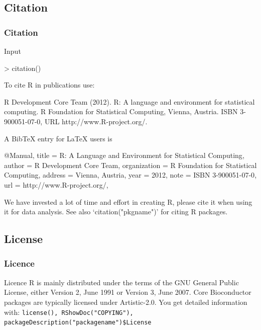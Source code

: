 \documentclass[xcolor={table},c]{beamer}
\begin{document}
\subsection{Citation}
\begin{frame}[shrink=11,fragile,c]\frametitle{Citation}
  \begin{block}{Input}
\begin{semiverbatim}
> citation()
\end{semiverbatim}
  \end{block}
\begin{semiverbatim}
To cite R in publications use:

  R Development Core Team (2012). R: A language and environment for
  statistical computing. R Foundation for Statistical Computing,
  Vienna, Austria. ISBN 3-900051-07-0, URL http://www.R-project.org/.

A BibTeX entry for LaTeX users is

  @Manual{,
    title = {R: A Language and Environment for Statistical Computing},
    author = {{R Development Core Team}},
    organization = {R Foundation for Statistical Computing},
    address = {Vienna, Austria},
    year = {2012},
    note = {{ISBN} 3-900051-07-0},
    url = {http://www.R-project.org/},
  }

We have invested a lot of time and effort in creating R, please cite it
when using it for data analysis. See also ‘citation("pkgname")’ for
citing R packages.

\end{semiverbatim}
\end{frame}

\subsection{License}
\begin{frame}\frametitle{Licence}
\begin{alertblock}{Licence}
R is mainly distributed under the terms of the GNU General
Public License, either Version 2, June 1991 or Version 3, June 2007. Core Bioconductor packages are typically licensed under Artistic-2.0. You get detailed information with: \texttt{license(), RShowDoc("COPYING"), packageDescription("packagename")\$License}
\end{alertblock}
\end{frame}
\end{document}
